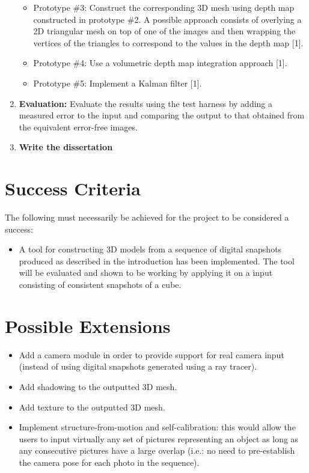 \begin{enumerate}
\begin{itemize}
	\item Prototype \#{3}: Construct the corresponding 3D mesh using depth map constructed in prototype \#{2}. A possible approach consists of overlying a 2D triangular mesh on top of one of the images and then wrapping the vertices of the triangles to correspond to the values in the depth map [1].
	\item Prototype \#{4}: Use a volumetric depth map integration approach [1].
	\item Prototype \#{5}: Implement a Kalman filter [1].  
	\end{itemize}
\item {\bf Evaluation:} Evaluate the results using the test harness by adding a measured error to the input and comparing the output to that obtained from the equivalent error-free images.
\item {\bf Write the dissertation}     
\end{enumerate}

\section*{Success Criteria}
The following must necessarily be achieved for the project to be considered a success:
\begin{itemize}
\item A tool for constructing 3D models from a sequence of digital snapshots produced as described in the introduction has been implemented. The tool will be evaluated and shown to be working by applying it on a input consisting of consistent snapshots of a cube.
\end{itemize}

\section*{Possible Extensions}
\begin{itemize}
\item Add a camera module in order to provide support for real camera input (instead of using digital snapshots generated using a ray tracer).
\item Add shadowing to the outputted 3D mesh. 
\item Add texture to the outputted 3D mesh.
\item Implement structure-from-motion and self-calibration: this would allow the users to input virtually any set of pictures representing an object as long as any consecutive pictures have a large overlap (i.e.: no need to pre-establish the camera pose for each photo in the sequence).
\end{itemize}

